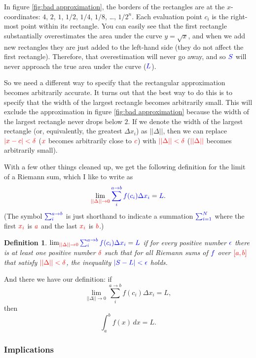 \documentclass{myarticle}
\newcommand{\hor}[1]{\textcolor{red}{#1}}
\newcommand{\ver}[1]{\textcolor{blue}{#1}}
\theoremstyle{nospace}
\newtheorem*{oldattempt}{Definition}
\newenvironment{attempt}
{\begin{mdframed}\begin{oldattempt}}
    {\end{oldattempt}\end{mdframed}}
\newtheorem{old series theorem}{Theorem}
\newenvironment{series theorem}
{\begin{mdframed}\begin{old series theorem}}
    {\end{old series theorem}\end{mdframed}}
\begin{document}
In figure \ref{fig:bad approximation}, the borders of the rectangles
are at the $x$-coordinates: $4$, $2$, $1$, $1/2$, $1/4$, $1/8$,
\ldots, $1/2^n$. Each evaluation point $c_i$ is the right-most point
within its rectangle. You can easily see that the first rectangle
substantially overestimates the area under the curve $y = \sqrt{x}$,
and when we add new rectangles they are just added to the left-hand
side (they do not affect the first rectangle). Therefore, that
overestimation will never go away, and so $\ver{S}$ will never
approach the true area under the curve ($\ver{L}$).

So we need a different way to specify that the rectangular
approximation becomes arbitrarily accurate. It turns out that the best
way to do this is to specify that the width of the largest rectangle
becomes arbitrarily small. This will exclude the approximation in
figure \ref{fig:bad approximation} because the width of the largest
rectangle never drops below $2$. If we denote the width of the largest
rectangle (or, equivalently, the greatest $\Delta x_i$) as
$||\Delta||$, then we can replace $\hor{|x - c| < \delta}$ ($\hor{x}$
becomes arbitrarily close to $\hor{c}$) with
$\hor{||\Delta|| < \delta}$ ($\hor{||\Delta||}$ becomes arbitrarily
small).

With a few other things cleaned up, we get the following definition
for the limit of a Riemann sum, which I like to write as
\[
  \lim_{\hor{||\Delta|| \to 0}}
  \ver{\sum_i^{a \to b} f(c_i) \Delta x_i}
  = \ver{L}.
\]
(The symbol $\ver{\sum_i^{a \to b}}$ is just shorthand to indicate a
summation $\ver{\sum_{i=1}^N}$ where the first $\hor{x_i}$ is
$\hor{a}$ and the last $\hor{x_i}$ is $\hor{b}$.)

\begin{attempt}
  $\lim_{\hor{||\Delta|| \to 0}} \ver{\sum_i^{a \to b} f(c_i) \Delta
    x_i} = \ver{L}$ if for every positive number $\ver{\epsilon}$
  there is at least one positive number $\hor{\delta}$ such that for
  all Riemann sums of $\ver{f}$ over $\hor{[a, b]}$ that satisfy
  $\hor{||\Delta|| < \delta}$, the inequality
  $\ver{|S - L| < \epsilon}$ holds.
\end{attempt}

And there we have our definition: if
\[
  \lim_{||\Delta|| \to 0} \sum_i^{a \to b} f(c_i) \Delta x_i = L,
\]
then
\[
  \int_a^b f(x) \,dx = L.
\]

\subsubsection{Implications}
\label{sec:integral definition implications}
\end{document}
